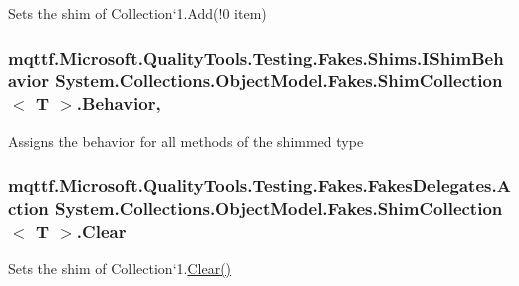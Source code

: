 Sets the shim of Collection`1.Add(!0 item)

\hypertarget{class_system_1_1_collections_1_1_object_model_1_1_fakes_1_1_shim_collection_3_01_t_01_4_a154564501027f5273d8077e1aff30e39}{
\subsubsection[{Behavior}]{\setlength{\rightskip}{0pt plus 5cm}mqttf.\-Microsoft.\-Quality\-Tools.\-Testing.\-Fakes.\-Shims.\-I\-Shim\-Behavior System.\-Collections.\-Object\-Model.\-Fakes.\-Shim\-Collection$<$ T $>$.Behavior\hspace{0.3cm}{\ttfamily [static]}, {\ttfamily [set]}}}\label{class_system_1_1_collections_1_1_object_model_1_1_fakes_1_1_shim_collection_3_01_t_01_4_a154564501027f5273d8077e1aff30e39}


Assigns the behavior for all methods of the shimmed type

\hypertarget{class_system_1_1_collections_1_1_object_model_1_1_fakes_1_1_shim_collection_3_01_t_01_4_a9647571e0623a1ef04d2ac68cd075d87}{
\subsubsection[{Clear}]{\setlength{\rightskip}{0pt plus 5cm}mqttf.\-Microsoft.\-Quality\-Tools.\-Testing.\-Fakes.\-Fakes\-Delegates.\-Action System.\-Collections.\-Object\-Model.\-Fakes.\-Shim\-Collection$<$ T $>$.Clear\hspace{0.3cm}{\ttfamily [set]}}}\label{class_system_1_1_collections_1_1_object_model_1_1_fakes_1_1_shim_collection_3_01_t_01_4_a9647571e0623a1ef04d2ac68cd075d87}


Sets the shim of Collection`1.\hyperlink{class_system_1_1_collections_1_1_object_model_1_1_fakes_1_1_shim_collection_3_01_t_01_4_a9647571e0623a1ef04d2ac68cd075d87}{Clear()}

